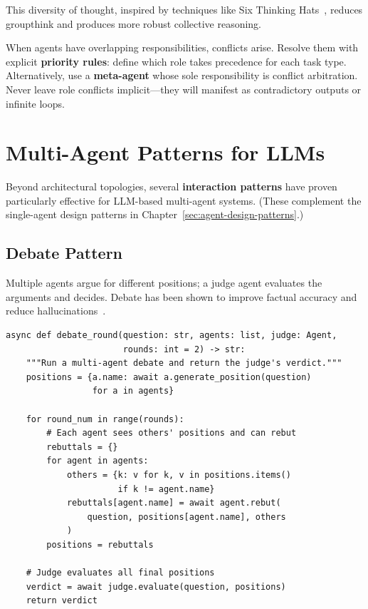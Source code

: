 This diversity of thought, inspired by techniques like Six Thinking Hats~\cite{debono1985six}, reduces groupthink and produces more robust collective reasoning.

\begin{warningbox}
When agents have overlapping responsibilities, conflicts arise. Resolve them with explicit \textbf{priority rules}: define which role takes precedence for each task type. Alternatively, use a \textbf{meta-agent} whose sole responsibility is conflict arbitration. Never leave role conflicts implicit---they will manifest as contradictory outputs or infinite loops.
\end{warningbox}

\section{Multi-Agent Patterns for LLMs}
\label{subsec:mas-patterns}

Beyond architectural topologies, several \textbf{interaction patterns} have proven particularly effective for LLM-based multi-agent systems. (These complement the single-agent design patterns in Chapter~\ref{sec:agent-design-patterns}.)

\subsection{Debate Pattern}
\label{debate-pattern}

Multiple agents argue for different positions; a judge agent evaluates the arguments and decides. Debate has been shown to improve factual accuracy and reduce hallucinations~\cite{du2023improving}.

\begin{lstlisting}[style=pythonstyle, caption={Debate pattern implementation}]
async def debate_round(question: str, agents: list, judge: Agent,
                       rounds: int = 2) -> str:
    """Run a multi-agent debate and return the judge's verdict."""
    positions = {a.name: await a.generate_position(question)
                 for a in agents}

    for round_num in range(rounds):
        # Each agent sees others' positions and can rebut
        rebuttals = {}
        for agent in agents:
            others = {k: v for k, v in positions.items()
                      if k != agent.name}
            rebuttals[agent.name] = await agent.rebut(
                question, positions[agent.name], others
            )
        positions = rebuttals

    # Judge evaluates all final positions
    verdict = await judge.evaluate(question, positions)
    return verdict
\end{lstlisting}

